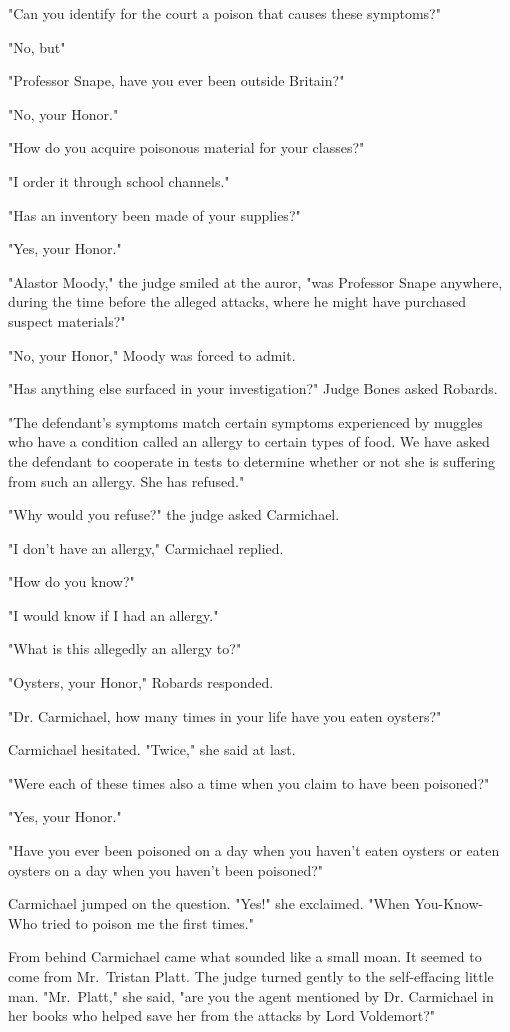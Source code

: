 "Can you identify for the court a poison that causes these symptoms?"

"No, but{\el}"

"Professor Snape, have you ever been outside Britain?"

"No, your Honor."

"How do you acquire poisonous material for your classes?"

"I order it through school channels."

"Has an inventory been made of your supplies?"

"Yes, your Honor."

"Alastor Moody," the judge smiled at the auror, "was Professor Snape anywhere, during the time before the alleged attacks, where he might have purchased suspect materials?"

"No, your Honor," Moody was forced to admit.

"Has anything else surfaced in your investigation?" Judge Bones asked Robards.

"The defendant's symptoms match certain symptoms experienced by muggles who have a condition called an allergy to certain types of food. We have asked the defendant to cooperate in tests to determine whether or not she is suffering from such an allergy. She has refused."

"Why would you refuse?" the judge asked Carmichael.

"I don't have an allergy," Carmichael replied.

"How do you know?"

"I would know if I had an allergy."

"What is this allegedly an allergy to?"

"Oysters, your Honor," Robards responded.

"Dr. Carmichael, how many times in your life have you eaten oysters?"

Carmichael hesitated. "Twice," she said at last.

"Were each of these times also a time when you claim to have been poisoned?"

"Yes, your Honor."

"Have you ever been poisoned on a day when you haven't eaten oysters or eaten oysters on a day when you haven't been poisoned?"

Carmichael jumped on the question. "Yes!" she exclaimed. "When You-Know-Who tried to poison me the first times."

From behind Carmichael came what sounded like a small moan. It seemed to come from Mr.~Tristan Platt. The judge turned gently to the self-effacing little man. "Mr.~Platt," she said, "are you the agent mentioned by Dr. Carmichael in her books who helped save her from the attacks by Lord Voldemort?"

